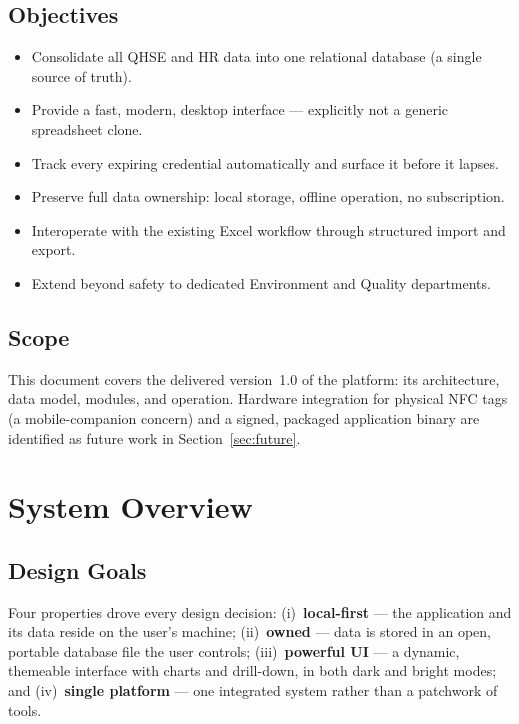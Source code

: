 \documentclass[11pt]{article}
\begin{document}
\subsection{Objectives}
\begin{itemize}
  \item Consolidate all QHSE and HR data into one relational database (a single source of truth).
  \item Provide a fast, modern, desktop interface --- explicitly not a generic spreadsheet clone.
  \item Track every expiring credential automatically and surface it before it lapses.
  \item Preserve full data ownership: local storage, offline operation, no subscription.
  \item Interoperate with the existing Excel workflow through structured import and export.
  \item Extend beyond safety to dedicated Environment and Quality departments.
\end{itemize}

\subsection{Scope}
This document covers the delivered version~1.0 of the platform: its architecture, data model,
modules, and operation. Hardware integration for physical NFC tags (a mobile-companion concern)
and a signed, packaged application binary are identified as future work in Section~\ref{sec:future}.

\section{System Overview}
\subsection{Design Goals}
Four properties drove every design decision: (i)~\textbf{local-first} --- the application and its
data reside on the user's machine; (ii)~\textbf{owned} --- data is stored in an open, portable
database file the user controls; (iii)~\textbf{powerful UI} --- a dynamic, themeable interface
with charts and drill-down, in both dark and bright modes; and (iv)~\textbf{single platform} ---
one integrated system rather than a patchwork of tools.
\end{document}
